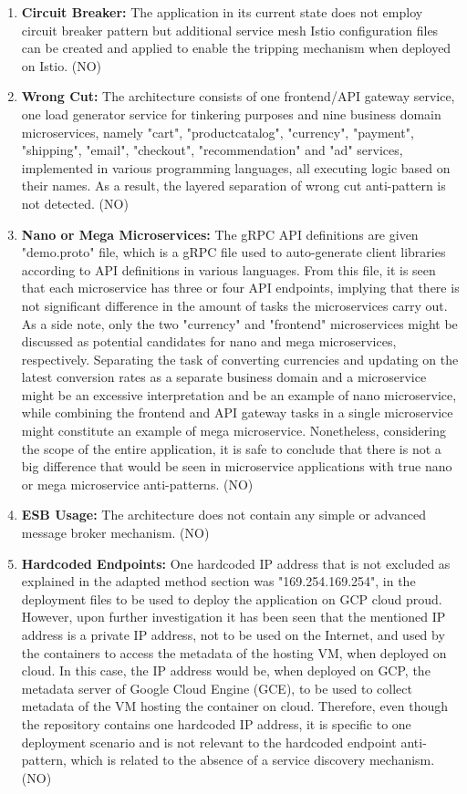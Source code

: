 \documentclass{Configuration_Files/PoliMi3i_thesis}
\begin{document}
\begin{enumerate}
    \item \textbf{Circuit Breaker:} The application in its current state does not employ circuit breaker pattern but additional service mesh Istio configuration files can be created and applied to enable the tripping mechanism when deployed on Istio. (NO)
    
    \item \textbf{Wrong Cut:} The architecture consists of one frontend/API gateway service, one load generator service for tinkering purposes and nine business domain microservices, namely "cart", "productcatalog", "currency", "payment", "shipping", "email", "checkout", "recommendation" and "ad" services, implemented in various programming languages, all executing logic based on their names.
    As a result, the layered separation of wrong cut anti-pattern is not detected. (NO)
    
    \item \textbf{Nano or Mega Microservices:} The gRPC API definitions are given "demo.proto" file, which is a gRPC file used to auto-generate client libraries according to API definitions in various languages.
    From this file, it is seen that each microservice has three or four API endpoints, implying that there is not significant difference in the amount of tasks the microservices carry out.
    As a side note, only the two "currency" and "frontend" microservices might be discussed as potential candidates for nano and mega microservices, respectively.
    Separating the task of converting currencies and updating on the latest conversion rates as a separate business domain and a microservice might be an excessive interpretation and be an example of nano microservice, while combining the frontend and API gateway tasks in a single microservice might constitute an example of mega microservice.
    Nonetheless, considering the scope of the entire application, it is safe to conclude that there is not a big difference that would be seen in microservice applications with true nano or mega microservice anti-patterns. (NO)
    
    \item \textbf{ESB Usage:} The architecture does not contain any simple or advanced message broker mechanism. (NO)
    
    \item \textbf{Hardcoded Endpoints:} One hardcoded IP address that is not excluded as explained in the adapted method section was "169.254.169.254", in the deployment files to be used to deploy the application on GCP cloud proud. 
    However, upon further investigation it has been seen that the mentioned IP address is a private IP address, not to be used on the Internet, and used by the containers to access the metadata of the hosting VM, when deployed on cloud.
    In this case, the IP address would be, when deployed on GCP, the metadata server of Google Cloud Engine (GCE), to be used to collect metadata of the VM hosting the container on cloud.
    Therefore, even though the repository contains one hardcoded IP address, it is specific to one deployment scenario and is not relevant to the hardcoded endpoint anti-pattern, which is related to the absence of a service discovery mechanism. (NO)
    

\end{enumerate}
\end{document}
